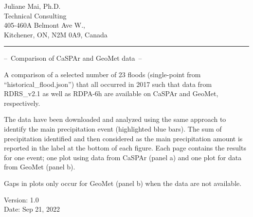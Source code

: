 \documentclass[10pt,a4paper,titlepage,parskip]{scrartcl}
\begin{document}
  
	
	\vspace*{-1cm}
	\pagestyle{fancy}
	
	\begin{center}
		Juliane Mai, Ph.D.\\
		Technical Consulting\\[4pt]
		405-460A Belmont Ave W., \\
		Kitchener, ON, N2M 0A9, Canada\\[10pt]
		{\rule{\linewidth}{0.4pt}}
	\end{center}
	\begin{center}
		\textcolor{myBlue}{{\Large --~Comparison of CaSPAr and GeoMet data~--}}\\[20pt]
	\end{center}
	A comparison of a selected number of 23 floods (single-point from ``historical\_flood.json'') that all occurred in 2017 such that data from RDRS\_v2.1 as well as RDPA-6h are available on CaSPAr and GeoMet, respectively.
	
	The data have been downloaded and analyzed using the same approach to identify the main precipitation event (highlighted blue bars). The sum of precipitation identified and then considered as the main precipitation amount is reported in the label at the bottom of each figure. Each page contains the results for one event; one plot using data from CaSPAr (panel a) and one plot for data from GeoMet (panel b).
	
	Gaps in plots only occur for GeoMet (panel b) when the data are not available.
	
	\vfill
	Version: 1.0\\
	Date: Sep 21, 2022\\
	
	
\pagebreak
\end{document}
